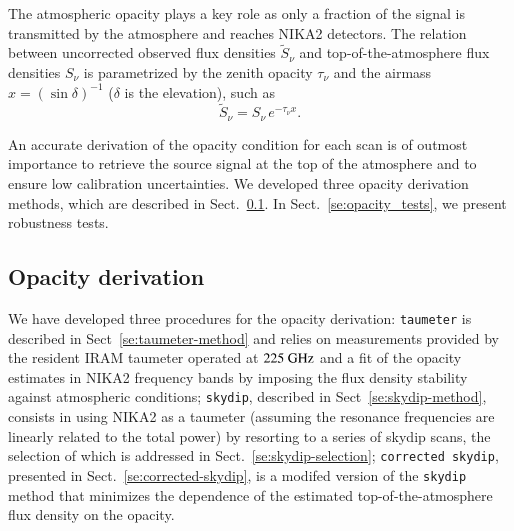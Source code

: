 
The atmospheric opacity plays a key role as only a fraction of the
signal is transmitted by the atmosphere and reaches NIKA2 detectors. 
The relation between uncorrected observed flux densities
$\tilde{S}_{\nu}$ and top-of-the-atmosphere flux densities $S_{\nu}$
is parametrized by the zenith opacity $\tau_{\nu}$
and the airmass $x = \left(\sin\delta\right)^{-1}$ ($\delta$ is the elevation), such as
\begin{equation}
\tilde{S}_{\nu} = S_{\nu} \, e^{-\tau_{\nu}  x}.
\label{eq:uncorr_flux}
\end{equation}

An accurate derivation of the opacity condition for each scan is
of outmost importance to retrieve the source signal at the top of the
atmosphere and to ensure low calibration uncertainties.
We developed three opacity derivation methods, which are described in
Sect.~\ref{se:opacity_methods}. In Sect.~\ref{se:opacity_tests}, we
present robustness tests.

\subsection{Opacity derivation}
\label{se:opacity_methods}

We have developed
three procedures for the opacity derivation: {\tt taumeter} is
described in Sect~\ref{se:taumeter-method} and relies on measurements
provided by the resident IRAM taumeter operated at $225~\rm{GHz}$ and
a fit of the opacity estimates in NIKA2 frequency bands by imposing
the flux density stability against atmospheric conditions;
{\tt skydip}, described in Sect~\ref{se:skydip-method}, consists in
using NIKA2 as a taumeter (assuming the resonance frequencies are
linearly related to the total power) by resorting to a series of
skydip scans, the selection of which is addressed in
Sect.~\ref{se:skydip-selection}; {\tt corrected skydip}, presented in
Sect.~\ref{se:corrected-skydip}, is a modifed
version of the {\tt skydip} method that minimizes the dependence of the
estimated top-of-the-atmosphere flux density on the opacity.

